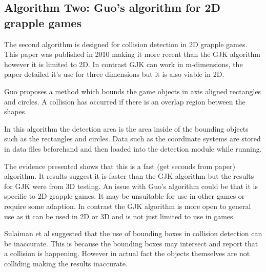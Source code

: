\documentclass{scrartcl}
\begin{document}
\subsection{Algorithm Two: Guo's algorithm for 2D grapple games}
 The second algorithm is designed for collision detection in 2D grapple games. This paper was published in 2010 making it more recent than the GJK algorithm however it is limited to 2D. In contrast GJK can work in m-dimensions, the paper detailed it’s use for three dimensions but it is also viable in 2D.  
 
 Guo \cite{Guo} proposes a method which bounds the game objects in axis aligned rectangles and circles. A collision has occurred if there is an overlap region between the shapes.
 
 In this algorithm the detection area is the area inside of the bounding objects such as the rectangles and circles.  Data such as the coordinate systems are stored in data files beforehand and then loaded into the detection module while running.
 
 The evidence presented shows that this is a fast (get seconds from paper) algorithm. It results suggest it is faster than the GJK algorithm but the results for GJK were from 3D testing. An issue with Guo's algorithm could be that it is specific to 2D grapple games. It may be unsuitable for use in other games or require some adaption. In contrast the GJK algorithm is more open to general use as it can be used in 2D or 3D and is not just limited to use in games.
 
 Sulaiman et al \cite{Sulaiman} suggested that the use of bounding boxes in collision detection can be inaccurate. This is because the bounding boxes may intersect and report that a collision is happening. However in actual fact the objects themselves are not colliding making the results inaccurate.
\end{document}
